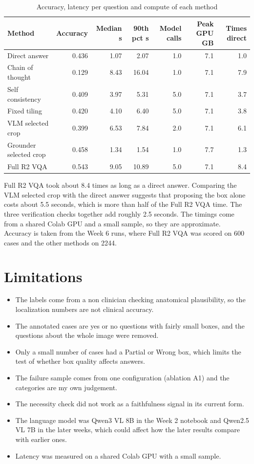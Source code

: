 \documentclass[11pt]{article}
\begin{document}
\begin{table}[h]
\centering
\caption{Accuracy, latency per question and compute of each method}
\begin{tabular}{lrrrrrr}
\toprule
Method & Accuracy & Median s & 90th pct s & Model calls & Peak GPU GB & Times direct \\
\midrule
Direct answer & 0.436 & 1.07 & 2.07 & 1.0 & 7.1 & 1.0 \\
Chain of thought & 0.129 & 8.43 & 16.04 & 1.0 & 7.1 & 7.9 \\
Self consistency & 0.409 & 3.97 & 5.31 & 5.0 & 7.1 & 3.7 \\
Fixed tiling & 0.420 & 4.10 & 6.40 & 5.0 & 7.1 & 3.8 \\
VLM selected crop & 0.399 & 6.53 & 7.84 & 2.0 & 7.1 & 6.1 \\
Grounder selected crop & 0.458 & 1.34 & 1.54 & 1.0 & 7.7 & 1.3 \\
Full R2 VQA & 0.543 & 9.05 & 10.89 & 5.0 & 7.1 & 8.4 \\
\bottomrule
\end{tabular}
\end{table}

 Full R2 VQA took about 8.4 times as long as a direct answer. Comparing the VLM selected crop with the direct answer suggests that proposing the box alone costs about 5.5 seconds, which is more than half of the Full R2 VQA time. The three verification checks together add roughly 2.5 seconds. The timings come from a shared Colab GPU and a small sample, so they are approximate. Accuracy is taken from the Week 6 runs, where Full R2 VQA was scored on 600 cases and the other methods on 2244.

\section{Limitations}
\begin{itemize}
\item The labels come from a non clinician checking anatomical plausibility, so the localization numbers are not clinical accuracy.
\item The annotated cases are yes or no questions with fairly small boxes, and the questions about the whole image were removed.
\item Only a small number of cases had a Partial or Wrong box, which limits the test of whether box quality affects answers.
\item The failure sample comes from one configuration (ablation A1) and the categories are my own judgement.
\item The necessity check did not work as a faithfulness signal in its current form.
\item The language model was Qwen3 VL 8B in the Week 2 notebook and Qwen2.5 VL 7B in the later weeks, which could affect how the later results compare with earlier ones.
\item Latency was measured on a shared Colab GPU with a small sample.
\end{itemize}
\end{document}
